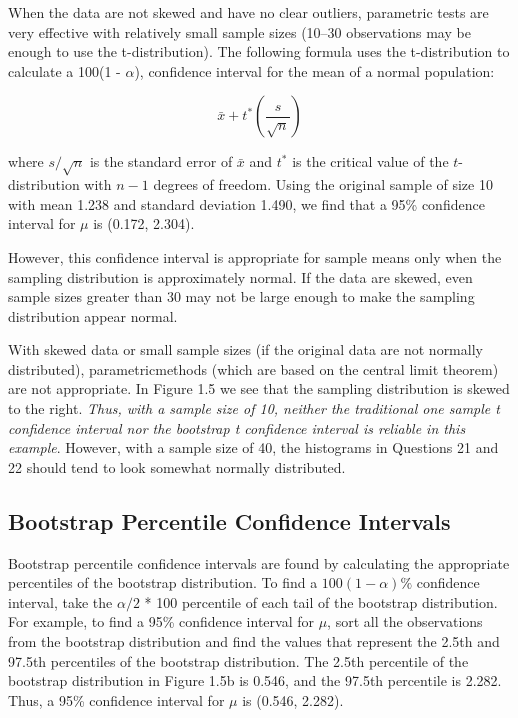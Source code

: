 \documentclass[
]{report}
\begin{document}
When the data are not skewed and have no clear outliers, parametric tests are very effective with relatively small sample sizes (10--30 observations may be enough to use the t-distribution). The following formula uses the t-distribution to calculate a 100(1 - \(\scriptstyle \alpha\)), confidence interval for the mean of a normal population:

\begin{equation} 
  \bar{x} + t^*\left(\frac{s}{\sqrt{n}}\right)
  \tag{1.2} \label{eq:1_2}
\end{equation}

where \(\scriptstyle s/\sqrt{n}\) is the standard error of \(\scriptstyle \bar{x}\) and \(\scriptstyle t^*\) is the critical value of the \(\scriptstyle t\)-distribution with \(\scriptstyle n - 1\) degrees of freedom. Using the original sample of size 10 with mean 1.238 and standard deviation 1.490, we find that a 95\% confidence interval for \(\scriptstyle \mu\) is (0.172, 2.304).

However, this confidence interval is appropriate for sample means only when the sampling distribution is approximately normal. If the data are skewed, even
sample sizes greater than 30 may not be large enough to make the sampling distribution appear normal.

With skewed data or small sample sizes (if the original data are not normally distributed), parametricmethods (which are based on the central limit theorem) are not appropriate. In Figure 1.5 we see that the sampling distribution is skewed to the right. \emph{Thus, with a sample size of 10, neither the traditional one sample t confidence interval nor the bootstrap t confidence interval is reliable in this example}. However, with a sample size of 40, the histograms in Questions 21 and 22 should tend to look somewhat normally distributed.

\hypertarget{bootstrap-percentile-confidence-intervals}{%
\subsection*{Bootstrap Percentile Confidence Intervals}\label{bootstrap-percentile-confidence-intervals}}

Bootstrap percentile confidence intervals are found by calculating the appropriate percentiles of the bootstrap distribution. To find a \(\scriptstyle 100(1 - \alpha)\%\) confidence interval, take the \(\scriptstyle \alpha/2\) * 100 percentile of each tail of the bootstrap distribution. For example, to find a 95\% confidence interval for \(\scriptstyle \mu\), sort all the observations from the bootstrap distribution and find the values that represent the 2.5th and 97.5th percentiles of the bootstrap distribution. The 2.5th percentile of the bootstrap distribution in Figure 1.5b is 0.546, and the 97.5th percentile is 2.282. Thus, a 95\% confidence interval for \(\scriptstyle \mu\) is (0.546, 2.282).
\end{document}
